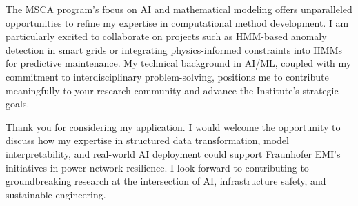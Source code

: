 \documentclass[11pt,a4paper, final]{moderncv}
\begin{document}
The MSCA program's focus on AI and mathematical modeling offers unparalleled opportunities to refine my expertise in computational method development. 
I am particularly excited to collaborate on projects such as HMM-based anomaly detection in smart grids or integrating physics-informed constraints into HMMs for predictive maintenance. 
My technical background in AI/ML, coupled with my commitment to interdisciplinary problem-solving, positions me to contribute meaningfully to your research community and advance the Institute's strategic goals.

Thank you for considering my application. 
I would welcome the opportunity to discuss how my expertise in structured data transformation, 
model interpretability, and real-world AI deployment could support Fraunhofer EMI's initiatives in power network resilience. 
I look forward to contributing to groundbreaking research at the intersection of AI, infrastructure safety, and sustainable engineering.

\makeletterclosing
\end{document}
